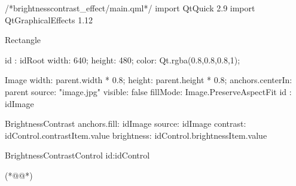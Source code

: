 \label{f000053}    %
\FloatBarrier                                  %
\begin{thebookfilesourceone}[escapeinside={(*@}{@*)},
caption=GoodLuck,
title=\filesourcenumbernameone \thefilesourcenumber
]
/*brightnesscontrast_effect/main.qml*/
import QtQuick 2.9
import QtGraphicalEffects 1.12

Rectangle {

    id : idRoot
    width: 640;
    height: 480;
    color: Qt.rgba(0.8,0.8,0.8,1);


    Image{
        width: parent.width * 0.8;
        height: parent.height * 0.8;
        anchors.centerIn: parent
        source: "image.jpg"
        visible: false
        fillMode: Image.PreserveAspectFit
        id : idImage
    }

    BrightnessContrast{
        anchors.fill: idImage
        source: idImage
        contrast: idControl.contrastItem.value
        brightness: idControl.brightnessItem.value
    }

    BrightnessContrastControl{
        id:idControl
    }

}(*@\marginpar[\hfill\setlength\fboxsep{2pt}\fbox{\footnotesize{\kaishu\parbox{1em}{\setlength{\baselineskip}{2pt}\filesourcenumbernameone}}\footnotesize{\thefilesourcenumber}}]{\setlength\fboxsep{2pt}\fbox{\footnotesize{\kaishu\parbox{1em}{\setlength{\baselineskip}{2pt}\filesourcenumbernameone}}\footnotesize{\thefilesourcenumber}}}@*)\end{thebookfilesourceone}          %
\addtocounter{lstlisting}{-1}   %



